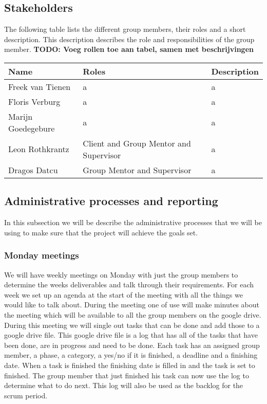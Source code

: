 \documentclass[]{article}
\newcommand{\TODO}[1]{{\color{red}\textbf{TODO: #1}}}
\begin{document}
\subsection{Stakeholders}
The following table lists the different group members, their roles and a short description.
This description describes the role and responsibilities of the group member.
\TODO{Voeg rollen toe aan tabel, samen met beschrijvingen}
\begin{tabular}{|l|l|l|}
\hline
Name & Roles & Description\\
\hline
Freek van Tienen & a & a\\
\hline
Floris Verburg & a & a\\
\hline
Marijn Goedegebure & a & a\\
\hline
Leon Rothkrantz & Client and Group Mentor and Supervisor & a\\
\hline
Dragos Datcu &  Group Mentor and Supervisor & a\\
\hline
\end{tabular}

\subsection{Administrative processes and reporting}
In this subsection we will be describe the administrative processes that we will be using to make sure that the project will achieve the goals set.
\subsubsection{Monday meetings}
We will have weekly meetings on Monday with just the group members to determine the weeks deliverables and talk through their requirements.
For each week we set up an agenda at the start of the meeting with all the things we would like to talk about.
During the meeting one of use will make minutes about the meeting which will be available to all the group members on the google drive.
During this meeting we will single out tasks that can be done and add those to a google drive file.
This google drive file is a log that has all of the tasks that have been done, are in progress and need to be done.
Each task has an assigned group member, a phase, a category, a yes/no if it is finished, a deadline and a finishing date.
When a task is finished the finishing date is filled in and the task is set to finished. The group member that just finished his task can now use the log to determine what to do next.
This log will also be used as the backlog for the scrum period.
\end{document}
